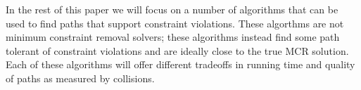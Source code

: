 In the rest of this paper we will focus on a number of algorithms that can be used to find paths that support constraint violations. These algorthms are not minimum constraint removal solvers; these algorithms instead find some path tolerant of constraint violations and are ideally close to the true MCR solution. Each of these algorithms will offer different tradeoffs in running time and quality of paths as measured by collisions. 
